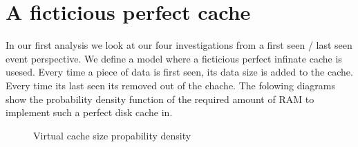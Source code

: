 \section{A ficticious perfect cache}
In our first analysis we look at our four investigations from a first seen / last seen event perspective. We define a model where a ficticious perfect infinate cache is usesed. Every time a piece of data is first seen, its data size is added to the cache. Every time its last seen its removed out of the chache. The folowing diagrams show the probability density function of the required amount of RAM to implement such a perfect disk cache in. 
\begin{figure}
\centering
{}
\hspace{0mm}
\caption{Virtual cache size propability density}
\end{figure}
